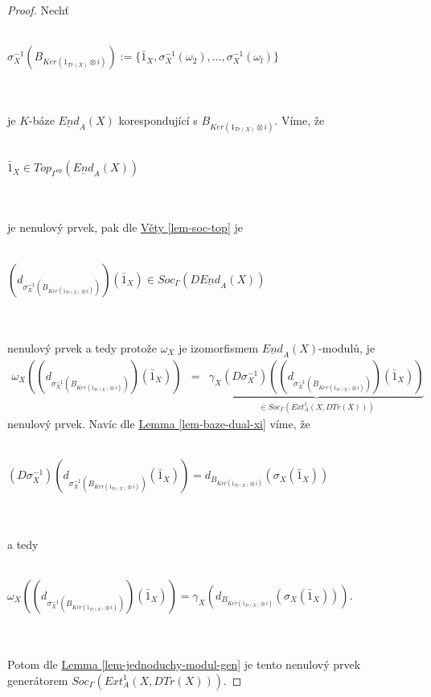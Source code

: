       \begin{proof}
        Nechť \\\\
        \centerline{$\sigma^{-1}_X(B_{Ker(1_{Tr(X)}\otimes i)}):=\{\bar 1_X,\sigma^{-1}_X(\omega_2),\ldots,\sigma^{-1}_X(\omega_l)\}$} 
        \\\\
         je $K$-báze $\underline{End}_A(X)$ korespondující s $B_{Ker(1_{Tr(X)}\otimes 
         i)}$. Víme, že \\\\
         \centerline{$\bar 1_X\in Top_{\Gamma^{op}}(\underline{End}_A(X))$}\\\\
         je nenulový prvek, pak dle \hyperref[lem-soc-top]{Věty \ref*{lem-soc-top}}  je\\\\
         \centerline{$(d_{\sigma_X^{-1}(B_{Ker(1_{Tr(X)}\otimes i)})})(\bar 1_X)\in Soc_\Gamma(D\underline{End}_A(X))$}\\\\
         nenulový prvek a tedy protože $\omega_X$ je izomorfismem $\underline{End}_A(X)$-modulů, je 
         \begin{eqnarray}
           \omega_X ((d_{\sigma_X^{-1}(B_{Ker(1_{Tr(X)}\otimes i)})})(\bar 1_X)) 
           &=& 
           \underbrace{
             \gamma_X(D\sigma_X^{-1}) ((d_{\sigma_X^{-1}(B_{Ker(1_{Tr(X)}\otimes i)})})(\bar 1_X))
           }_{\in Soc_\Gamma(Ext_A^1(X,DTr(X)))}   
           \nonumber
         \end{eqnarray}
         nenulový prvek. Navíc dle \hyperref[lem-baze-dual-xi]{Lemma \ref*{lem-baze-dual-xi}} 
         víme, že \\\\
         \centerline{$
           (D\sigma_X^{-1}) (d_{\sigma_X^{-1}(B_{Ker(1_{Tr(X)}\otimes i)})}(\bar 1_X))
           = 
           d_{B_{Ker(1_{Tr(X)}\otimes i)}}(\sigma_X(\bar 1_X)) 
         $}\\\\
         a tedy \\\\
         \centerline{$
           \omega_X ((d_{\sigma_X^{-1}(B_{Ker(1_{Tr(X)}\otimes i)})})(\bar 1_X)) 
           = 
           \gamma_X( d_{B_{Ker(1_{Tr(X)}\otimes i)}}(\sigma_X(\bar 1_X))  )
         $.}\\\\
         Potom dle \hyperref[lem-jednoduchy-modul-gen]{Lemma \ref*{lem-jednoduchy-modul-gen}} 
         je tento nenulový prvek generátorem $Soc_\Gamma(Ext_A^1(X,DTr(X)))$.
      \end{proof}
      

